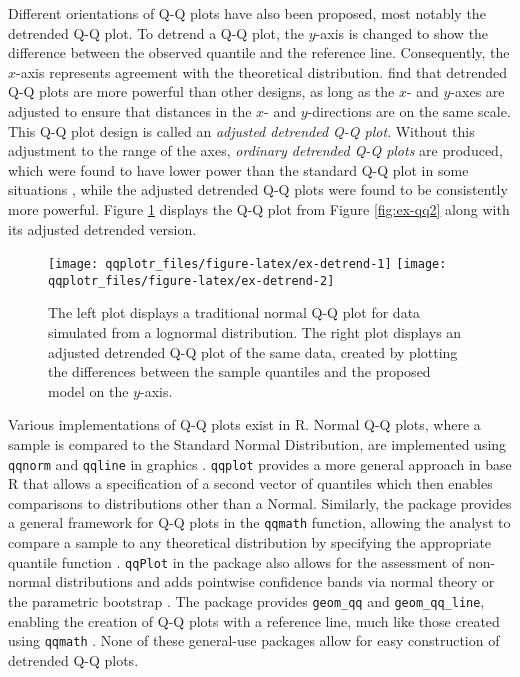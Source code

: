 Different orientations of Q-Q plots have also been proposed, most
notably the detrended Q-Q plot. To detrend a Q-Q plot, the \(y\)-axis is
changed to show the difference between the observed quantile and the
reference line. Consequently, the \(x\)-axis represents agreement with
the theoretical distribution. \citet{Loy2016-fg} find that detrended Q-Q
plots are more powerful than other designs, as long as the \(x\)- and
\(y\)-axes are adjusted to ensure that distances in the \(x\)- and
\(y\)-directions are on the same scale. This Q-Q plot design is called
an \emph{adjusted detrended Q-Q plot}. Without this adjustment to the
range of the axes, \emph{ordinary detrended Q-Q plots} are produced,
which were found to have lower power than the standard Q-Q plot in some
situations \citep{Loy2016-fg}, while the adjusted detrended Q-Q plots
were found to be consistently more powerful. Figure \ref{fig:ex-detrend}
displays the Q-Q plot from Figure \ref{fig:ex-qq2} along with its
adjusted detrended version.

\begin{Schunk}
\begin{figure}

{\centering \texttt{[image: qqplotr\_files/figure-latex/ex-detrend-1]} \texttt{[image: qqplotr\_files/figure-latex/ex-detrend-2]} 

}

\caption[The left plot displays a traditional normal Q-Q plot for data simulated from a lognormal distribution]{The left plot displays a traditional normal Q-Q plot for data simulated from a lognormal distribution. The right plot displays an adjusted detrended Q-Q plot of the same data, created by plotting the differences between the sample quantiles and the proposed model on the $y$-axis.}\label{fig:ex-detrend}
\end{figure}
\end{Schunk}

Various implementations of Q-Q plots exist in R. Normal Q-Q plots, where
a sample is compared to the Standard Normal Distribution, are
implemented using \texttt{qqnorm} and \texttt{qqline} in 
graphics \citep{R}. \texttt{qqplot} provides a more general approach in
base R that allows a specification of a second vector of quantiles which
then enables comparisons to distributions other than a Normal.
Similarly, the  package provides a general framework for
Q-Q plots in the \texttt{qqmath} function, allowing the analyst to
compare a sample to any theoretical distribution by specifying the
appropriate quantile function \citep{lattice}. \texttt{qqPlot} in the
 package also allows for the assessment of non-normal
distributions and adds pointwise confidence bands via normal theory or
the parametric bootstrap \citep{car}. The  package provides
\texttt{geom\_qq} and \texttt{geom\_qq\_line}, enabling the creation of
Q-Q plots with a reference line, much like those created using
\texttt{qqmath} \citep{ggplot2}. None of these general-use packages
allow for easy construction of detrended Q-Q plots.

